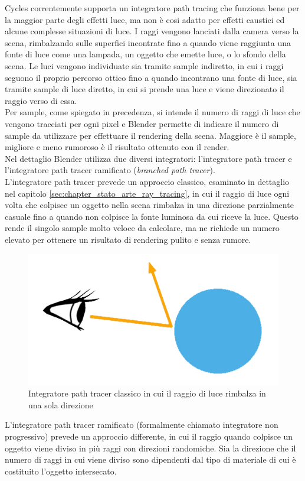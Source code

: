 Cycles correntemente supporta un integratore path tracing che funziona bene per la maggior parte degli effetti luce, ma non è cosi adatto per effetti caustici ed alcune complesse situazioni di luce. I raggi vengono lanciati dalla camera verso la scena, rimbalzando sulle superfici incontrate fino a quando viene raggiunta una fonte di luce come una lampada, un oggetto che emette luce, o lo sfondo della scena. 
Le luci vengono individuate sia tramite sample indiretto, in cui i raggi seguono il proprio percorso ottico fino a quando incontrano una fonte di luce, sia tramite sample di luce diretto, in cui si prende una luce e viene direzionato il raggio verso di essa.
\\
Per sample, come spiegato in precedenza, si intende il numero di raggi di luce che vengono tracciati per ogni pixel e Blender permette di indicare il numero di sample da utilizzare per effettuare il rendering della scena. Maggiore è il sample, migliore e meno rumoroso è il risultato ottenuto con il render.
\\
Nel dettaglio Blender utilizza due diversi integratori: l’integratore path tracer e l’integratore path tracer ramificato (\emph{branched path tracer}).
\\
L’integratore path tracer prevede un approccio classico, esaminato in dettaglio nel capitolo \ref{sec:chapter_stato_arte_ray_tracing}, in cui il raggio di luce ogni volta che colpisce un oggetto nella scena rimbalza in una direzione parzialmente casuale fino a quando non colpisce la fonte luminosa da cui riceve la luce.
Questo rende il singolo sample molto veloce da calcolare, ma ne richiede un numero elevato per ottenere un risultato di rendering pulito e senza rumore.
\begin{figure}[htb]
 \centering
 \includegraphics[width=0.6\linewidth]{images/chapter_tecnologie_abilitanti/tecnologie_abilitanti_sferaluce1.jpg}\hfill
 \caption[Integratore path tracer classico]{Integratore path tracer classico in cui il raggio di luce rimbalza in una sola direzione}
 \label{fig:tecnologie_abilitanti_sferaluce1}
\end{figure}
L’integratore path tracer ramificato (formalmente chiamato integratore non progressivo) prevede un approccio differente, in cui il raggio quando colpisce un oggetto  viene diviso in più raggi con direzioni randomiche. Sia la direzione che il numero di raggi in cui viene diviso sono dipendenti dal tipo di materiale di cui è costituito l’oggetto intersecato.
